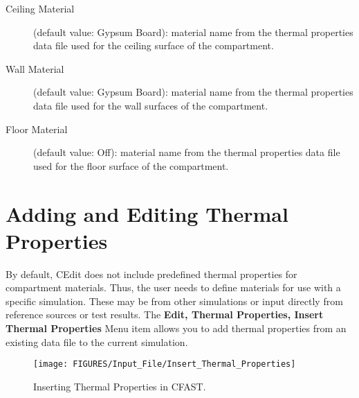 \begin{description}
\item[Ceiling Material] (default value: Gypsum Board): material name from the thermal properties data file used for the ceiling surface of the compartment.

\item[Wall Material] (default value: Gypsum Board): material name from the thermal properties data file used for the wall surfaces of the compartment.

\item[Floor Material] (default value: Off): material name from the thermal properties data file used for the floor surface of the compartment.
    \end{description}


\section{Adding and Editing Thermal Properties}

By default, CEdit does not include predefined thermal properties for compartment materials. Thus, the user needs to define materials for use with a specific simulation.  These may be from other simulations or input directly from reference sources or test results. The \textbf{Edit, Thermal Properties, Insert Thermal Properties} Menu item allows you to add thermal properties from an existing data file to the current simulation.

\begin{figure}[h!]
\begin{center}
\texttt{[image: FIGURES/Input\_File/Insert\_Thermal\_Properties]}
\caption[Inserting Thermal Properties in CFAST]{Inserting Thermal Properties in CFAST.}
\end{center}
\end{figure}

